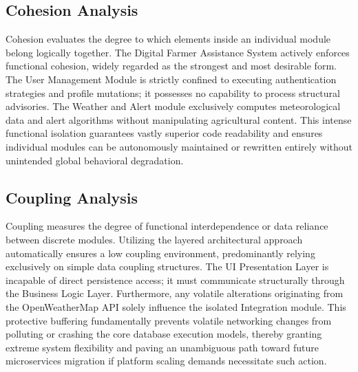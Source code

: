 \subsection{Cohesion Analysis}
Cohesion evaluates the degree to which elements inside an individual module belong logically together. The Digital Farmer Assistance System actively enforces functional cohesion, widely regarded as the strongest and most desirable form. The User Management Module is strictly confined to executing authentication strategies and profile mutations; it possesses no capability to process structural advisories. The Weather and Alert module exclusively computes meteorological data and alert algorithms without manipulating agricultural content. This intense functional isolation guarantees vastly superior code readability and ensures individual modules can be autonomously maintained or rewritten entirely without unintended global behavioral degradation.

\subsection{Coupling Analysis}
Coupling measures the degree of functional interdependence or data reliance between discrete modules. Utilizing the layered architectural approach automatically ensures a low coupling environment, predominantly relying exclusively on simple data coupling structures. The UI Presentation Layer is incapable of direct persistence access; it must communicate structurally through the Business Logic Layer. Furthermore, any volatile alterations originating from the OpenWeatherMap API solely influence the isolated Integration module. This protective buffering fundamentally prevents volatile networking changes from polluting or crashing the core database execution models, thereby granting extreme system flexibility and paving an unambiguous path toward future microservices migration if platform scaling demands necessitate such action.

